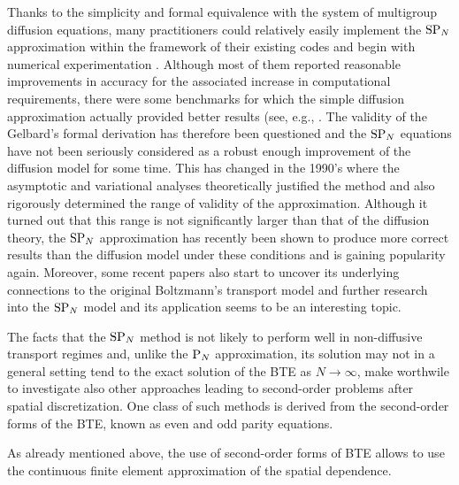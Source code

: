Thanks to the simplicity and formal equivalence with the system of multigroup diffusion equations, many practitioners could relatively easily implement the $\mathrm{SP}_{N}$ approximation within the framework of their existing codes and begin with numerical experimentation . Although most of them reported reasonable improvements in accuracy for the associated increase in computational requirements, there were some benchmarks for which the simple diffusion approximation actually provided better results (see, e.g., \cite[p. 247]{Coppa1}. The validity of the Gelbard's formal derivation has therefore been questioned and the $\mathrm{SP}_{N}$ equations have not been seriously considered as a robust enough improvement of the diffusion model for some time. This has changed in the 1990's where the asymptotic and variational analyses theoretically justified the method and also rigorously determined the range of validity of the approximation. Although it turned out that this range is not significantly larger than that of the diffusion theory, the $\mathrm{SP}_{N}$ approximation has recently been shown to produce more correct results than the diffusion model under these conditions and is gaining popularity again. Moreover, some recent papers also start to uncover its underlying connections to the original Boltzmann's transport model and further research into the $\mathrm{SP}_{N}$ model and its application seems to be an interesting topic.

The facts that the $\mathrm{SP}_{N}$ method is not likely to perform well in non-diffusive transport regimes and, unlike the $\mathrm{P}_{N}$ approximation, its solution may not in a general setting tend to the exact solution of the BTE as $N\to\infty$, make worthwile to investigate also other approaches leading to second-order problems after spatial discretization. One class of such methods is derived from the second-order forms of the BTE, known as even and odd parity equations. 

As already mentioned above, the use of second-order forms of BTE allows to use the continuous finite element approximation of the spatial dependence. 



